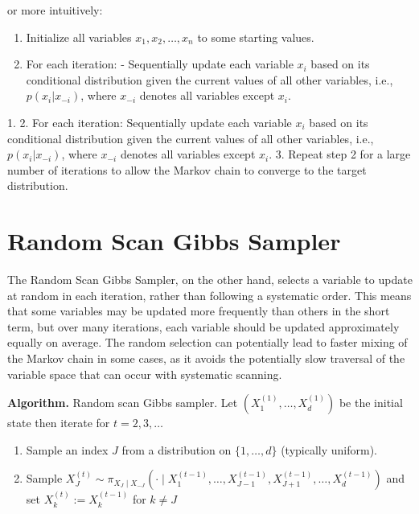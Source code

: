 \documentclass[10pt]{article}
\begin{document}
or more intuitively:
\begin{enumerate}
    \item Initialize all variables \(x_1, x_2, \ldots, x_n\) to some starting values.
    \item For each iteration:
   - Sequentially update each variable \(x_i\) based on its conditional distribution given the current values of all other variables, i.e., \(p(x_i | x_{-i})\), where \(x_{-i}\) denotes all variables except \(x_i\).
\end{enumerate}
1. 
2. For each iteration:
    Sequentially update each variable \(x_i\) based on its conditional distribution given the current values of all other variables, i.e., \(p(x_i | x_{-i})\), where \(x_{-i}\) denotes all variables except \(x_i\).
3. Repeat step 2 for a large number of iterations to allow the Markov chain to converge to the target distribution.

\section{Random Scan Gibbs Sampler}

The Random Scan Gibbs Sampler, on the other hand, selects a variable to update at random in each iteration, rather than following a systematic order. This means that some variables may be updated more frequently than others in the short term, but over many iterations, each variable should be updated approximately equally on average. The random selection can potentially lead to faster mixing of the Markov chain in some cases, as it avoids the potentially slow traversal of the variable space that can occur with systematic scanning.

\textbf{Algorithm. }Random scan Gibbs sampler. Let $\left(X_1^{(1)}, \ldots, X_d^{(1)}\right)$ be the initial state then iterate for $t=2,3, \ldots$
\newline
\begin{enumerate}
    \item Sample an index $J$ from a distribution on $\{1, \ldots, d\}$ (typically uniform).
    \item  Sample $X_J^{(t)} \sim \pi_{X_J \mid X_{-J}}\left(\cdot \mid X_1^{(t-1)}, \ldots, X_{J-1}^{(t-1)}, X_{J+1}^{(t-1)}, \ldots, X_d^{(t-1)}\right)$ and set $X_k^{(t)}:=X_k^{(t-1)}$ for $k \neq J$
\end{enumerate}
\end{document}
